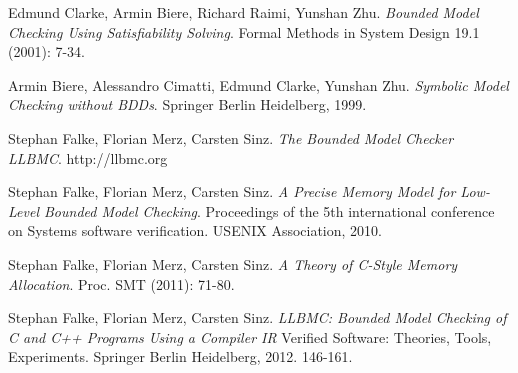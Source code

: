 \documentclass[14pt]{article}
\begin{document}
{

\begin{thebibliography}{9}

Edmund Clarke, Armin Biere, Richard Raimi, Yunshan Zhu.
\textit{Bounded Model Checking Using Satisfiability Solving}.
Formal Methods in System Design 19.1 (2001): 7-34.

Armin Biere, Alessandro Cimatti, Edmund Clarke, Yunshan Zhu.
\textit{Symbolic Model Checking without BDDs}. 
Springer Berlin Heidelberg, 1999.

Stephan Falke, Florian Merz, Carsten Sinz.
\textit{The Bounded Model Checker LLBMC}. 
http://llbmc.org

Stephan Falke, Florian Merz, Carsten Sinz.
\textit{A Precise Memory Model for Low-Level Bounded Model Checking}.
Proceedings of the 5th international conference on Systems software verification. USENIX Association, 2010.

Stephan Falke, Florian Merz, Carsten Sinz.
\textit{A Theory of C-Style Memory Allocation}.
Proc. SMT (2011): 71-80.

Stephan Falke, Florian Merz, Carsten Sinz.
\textit{LLBMC: Bounded Model Checking of C and C++ Programs Using a Compiler IR}
Verified Software: Theories, Tools, Experiments. Springer Berlin Heidelberg, 2012. 146-161.


\end{thebibliography}}
\end{document}
